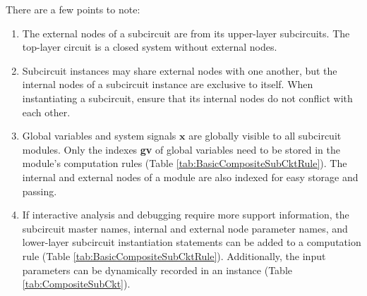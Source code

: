 There are a few points to note:
\begin{enumerate}[partopsep=0pt,topsep=0pt,itemsep=0pt,parsep=0pt]
\item The external nodes of a subcircuit are from its upper-layer subcircuits. The top-layer circuit is a closed system without external nodes.
\item Subcircuit instances may share external nodes with one another, but the internal nodes of a subcircuit instance are exclusive to itself. When instantiating a subcircuit, ensure that its internal nodes do not conflict with each other.
\item Global variables and system signals $\bm{x}$ are globally visible to all subcircuit modules. Only the indexes \textbf{gv} of global variables need to be stored in the module's computation rules (Table \ref{tab:BasicCompositeSubCktRule}). The internal and external nodes of a module are also indexed for easy storage and passing.
\item If interactive analysis and debugging require more support information, the subcircuit master names, internal and external node parameter names, and lower-layer subcircuit instantiation statements can be added to a computation rule (Table \ref{tab:BasicCompositeSubCktRule}). Additionally, the input parameters can be dynamically recorded in an instance (Table \ref{tab:CompositeSubCkt}).
\end{enumerate}

